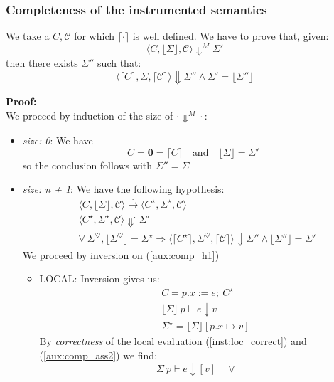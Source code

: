 \documentclass[12pt,a4paper,twoside]{book}
\newcommand{\heart}{\heartsuit}
\begin{document}
\subsubsection{Completeness of the instrumented semantics}
We take a  $C, \mathscr{C}$ for which $\lceil \cdot \rceil$ is well defined.
We have to prove that, given:
$$
\langle C, \lfloor \Sigma \rfloor, \mathscr{C}\rangle \Downarrow^M \Sigma'
$$
then there exists $\Sigma''$ such that:
$$
\langle \lceil C \rceil, \Sigma, \lceil \mathscr{C}\rceil\rangle \Downarrow \Sigma''
\land \Sigma' = \lfloor \Sigma'' \rfloor 
$$


\noindent\textbf{Proof:}\\
We proceed by induction of the size of $\cdot \Downarrow^M \cdot$:
\begin{itemize}
\item \emph{size: 0}: We have 
$$ C = \boldsymbol{0} = \lceil C \rceil
\quad \text{and}\quad \lfloor \Sigma \rfloor = \Sigma'$$
so the conclusion follows with $\Sigma'' = \Sigma$
\item \emph{size: n + 1}: We have the following hypothesis:
\begin{align}
&\langle C, \lfloor \Sigma \rfloor, \mathscr{C}\rangle \xrightarrow{.}
\langle C^\star, \Sigma^\star, \mathscr{C}\rangle
\label{aux:comp_h1}\tag{H1}\\
&\langle C^\star, \Sigma^\star, \mathscr{C}\rangle
\Downarrow^\cdot \Sigma'
\label{aux:comp_h2}\tag{H2}\\
&\forall~\Sigma^\heart, \lfloor \Sigma^\heart \rfloor = \Sigma^\star
\Rightarrow \langle \lceil C^\star \rceil, \Sigma^\heart, \lceil \mathscr{C} \rceil\rangle \Downarrow \Sigma'' \land \lfloor \Sigma'' \rfloor = \Sigma'
\label{aux:comp_ih}\tag{IH}
\end{align}
We proceed by inversion on (\ref{aux:comp_h1})
\begin{itemize}
\item LOCAL: Inversion gives us:
\begin{align}
&C = p.x := e;~ C^\star \label{aux:comp_ass1}\tag{I1}\\
&\lfloor \Sigma \rfloor~p \vdash e \downarrow v \label{aux:comp_ass2}\tag{I2}\\
&\Sigma^\star = \lfloor \Sigma \rfloor[p.x \mapsto v]\label{aux:comp_ass3}\tag{I3}
\end{align}
By \emph{correctness} of the local evaluation (\ref{inst:loc_correct}) and (\ref{aux:comp_ass2}) we find:
\begin{equation}\label{aux:comp_ass4}
\Sigma~p \vdash e \downarrow [v] \quad \lor \quad

\end{equation}
\end{itemize}
\end{itemize}
\end{document}
